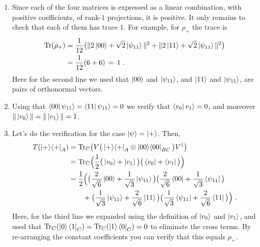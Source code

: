 \documentclass[12pt]{article}
\begin{document}
\begin{enumerate}
\begin{enumerate}
\item Since each of the four matrices is expressed as a linear combination, with positive coefficients, of rank-$1$ projections, it is positive. It only remains to check that each of them has trace $1$. For example, for $\rho_+$ the trace is 
\begin{align*}
 \mathrm{Tr}(\rho_+) &= \frac{1}{12} \big(\| 2 \ket{00} + \sqrt{2} \ket{\psi_{11}}\|^2 +\| 2 \ket{11} + \sqrt{2} \ket{\psi_{11}}\|^2 \big) \\
&= \frac{1}{12} (6+6)\,=\,1\;.
\end{align*}
Here for the second line we used that $\ket{00}$ and $\ket{\psi_{11}}$, and $\ket{11}$ and $\ket{\psi_{11}}$, are pairs of orthonormal vectors. 
\item Using that $\bra{00}\psi_{11}\rangle = \bra{11}\psi_{11}\rangle = 0$ we verify that 
$\bra{v_0}v_1\rangle =0$, and moreover $\|\ket{v_0}\|=\|\ket{v_1}\|=1$.
\item  Let's do the verification for the case $\ket{\psi}=\ket{+}$. Then,
\begin{align*}
T(\ket{+}\!\bra{+}_A) &= \mathrm{Tr}_C \big( V\big( \ket{+}\!\bra{+}_A \otimes \ket{00}\!\bra{00}_{BC} \big) V^\dagger \big)\\
&= \mathrm{Tr}_C \Big( \frac{1}{2}\big( \ket{v_0}+\ket{v_1} \big) \big( \bra{v_0} + \bra{v_1} \big) \Big)\\
&= \frac{1}{2} \Big( \big(\frac{2}{\sqrt{6}} \ket{00} + \frac{1}{\sqrt{3}} \ket{\psi_{11}} \big)\big(\frac{2}{\sqrt{6}} \bra{00} + \frac{1}{\sqrt{3}} \bra{\psi_{11}}\big) \\
&\qquad + \big(\frac{1}{\sqrt{3}} \ket{\psi_{11}} +\frac{2}{\sqrt{6}} \ket{11} \big)\big( \frac{1}{\sqrt{3}} \bra{\psi_{11}}+\frac{2}{\sqrt{6}} \bra{11} \big) \Big)\;.
\end{align*}
Here, for the third line we expanded using the definition of $\ket{v_0}$ and $\ket{v_1}$, and used that $\mathrm{Tr}_C(\ket{0}\bra{1}_C)=\mathrm{Tr}_C(\ket{1}\bra{0}_C)=0$ to eliminate the cross terms. 
By re-arranging the constant coefficients you can verify that this equals $\rho_+$. 

\end{enumerate}


\end{enumerate}
\end{document}
